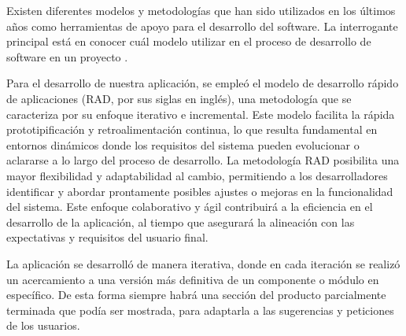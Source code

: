 Existen diferentes modelos y metodologías que han sido utilizados en los últimos años como herramientas de apoyo para el desarrollo del software. La interrogante principal está en conocer cuál modelo utilizar en el proceso de desarrollo de software en un proyecto \cite{DELGADOOLIVERA2021}.

Para el desarrollo de nuestra aplicación, se empleó el modelo de desarrollo rápido de aplicaciones (RAD, por sus siglas en inglés), una metodología que se caracteriza por su enfoque iterativo e incremental. Este modelo facilita la rápida prototipificación y retroalimentación continua, lo que resulta fundamental en entornos dinámicos donde los requisitos del sistema pueden evolucionar o aclararse a lo largo del proceso de desarrollo. La metodología RAD posibilita una mayor flexibilidad y adaptabilidad al cambio, permitiendo a los desarrolladores identificar y abordar prontamente posibles ajustes o mejoras en la funcionalidad del sistema. Este enfoque colaborativo y ágil contribuirá a la eficiencia en el desarrollo de la aplicación, al tiempo que asegurará la alineación con las expectativas y requisitos del usuario final.

La aplicación se desarrolló de manera iterativa, donde en cada iteración se realizó un acercamiento a una versión más definitiva de un componente o módulo en específico. De esta forma siempre habrá una sección del producto parcialmente terminada que podía ser mostrada, para adaptarla a las sugerencias y peticiones de los usuarios.